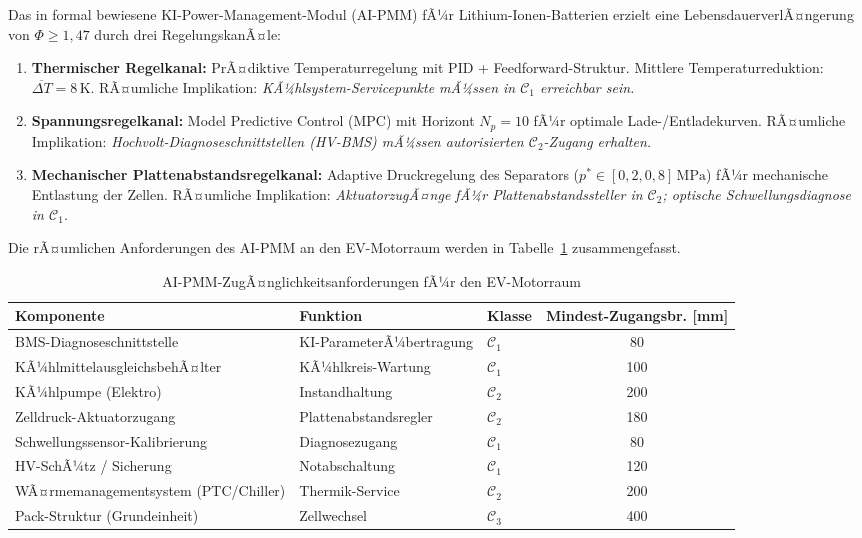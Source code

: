 ﻿\documentclass[12pt,a4paper]{article}
\begin{document}
Das in \cite{Epp2026liion} formal bewiesene KI-Power-Management-Modul (AI-PMM)
fÃ¼r Lithium-Ionen-Batterien erzielt eine LebensdauerverlÃ¤ngerung von
$\Phi \geq 1{,}47$ durch drei RegelungskanÃ¤le:

\begin{enumerate}[leftmargin=*, label=(\Roman*)]
	\item \textbf{Thermischer Regelkanal:} PrÃ¤diktive Temperaturregelung mit
	PID + Feedforward-Struktur. Mittlere Temperaturreduktion:
	$\overline{\Delta T} = 8\,\mathrm{K}$.
	RÃ¤umliche Implikation: \textit{KÃ¼hl\-system-Servicepunkte mÃ¼ssen in $\mathcal{C}_1$
	erreichbar sein.}

	\item \textbf{Spannungsregelkanal:} Model Predictive Control (MPC) mit
	Horizont $N_p = 10$ fÃ¼r optimale Lade-/Entladekurven.
	RÃ¤umliche Implikation: \textit{Hochvolt-Diagnoseschnitt\-stellen (HV-BMS)
	mÃ¼ssen autorisierten $\mathcal{C}_2$-Zugang erhalten.}

	\item \textbf{Mechanischer Plattenabstandsregelkanal:} Adaptive Druckregelung
	des Separators ($p^* \in [0{,}2, 0{,}8]\,\mathrm{MPa}$) fÃ¼r mechanische
	Entlastung der Zellen. RÃ¤umliche Implikation: \textit{AktuatorzugÃ¤nge fÃ¼r
	Plattenabstandssteller in $\mathcal{C}_2$; optische Schwellungsdiagnose in $\mathcal{C}_1$.}
\end{enumerate}

Die rÃ¤umlichen Anforderungen des AI-PMM an den EV-Motorraum werden in
Tabelle~\ref{tab:aipmm_anforderungen} zusammengefasst.

\begin{table}
	\centering
	\caption{AI-PMM-ZugÃ¤nglichkeitsanforderungen fÃ¼r den EV-Motorraum}
	\label{tab:aipmm_anforderungen}
	\begin{tabular}{lllc}
		\toprule
		\textbf{Komponente} & \textbf{Funktion} & \textbf{Klasse} & \textbf{Mindest-Zugangsbr. [mm]} \\
		\midrule
		BMS-Diagnoseschnittstelle & KI-ParameterÃ¼bertragung & $\mathcal{C}_1$ & 80 \\
		KÃ¼hlmittelausgleichsbehÃ¤lter & KÃ¼hlkreis-Wartung & $\mathcal{C}_1$ & 100 \\
		KÃ¼hlpumpe (Elektro) & Instandhaltung & $\mathcal{C}_2$ & 200 \\
		Zelldruck-Aktuatorzugang & Plattenabstandsregler & $\mathcal{C}_2$ & 180 \\
		Schwellungssensor-Kalibrierung & Diagnosezugang & $\mathcal{C}_1$ & 80 \\
		HV-SchÃ¼tz / Sicherung & Notabschaltung & $\mathcal{C}_1$ & 120 \\
		WÃ¤rmemanagementsystem (PTC/Chiller) & Thermik-Service & $\mathcal{C}_2$ & 200 \\
		Pack-Struktur (Grundeinheit) & Zellwechsel & $\mathcal{C}_3$ & 400 \\
		\bottomrule
	\end{tabular}
\end{table}
\end{document}
